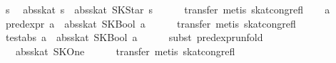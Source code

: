 \begin{isabellebody}
\ s\ \isamarkupfalse%
\ {}abs{}skat\ s\ {}\ abs{}skat\ {}SKStar\ s{}{}\isanewline
\ \ \ \ \isamarkupfalse%
\ {}transfer{}\ metis\ skat{}cong{}refl{}\isanewline
{}\isamarkupfalse%
\isanewline
\ \ \isamarkupfalse%
\ a\isanewline
\ \ \isamarkupfalse%
\ {}pred{}expr\ a\ {}\ abs{}skat\ {}SKBool\ a{}{}\isanewline
\ \ \ \ \isamarkupfalse%
\ {}transfer{}\ metis\ skat{}cong{}refl{}\isanewline
\ \ \isamarkupfalse%
\ {}test{}abs\ a\ {}\ abs{}skat\ {}SKBool\ a{}{}\isanewline
\ \ \ \ \isamarkupfalse%
\ {}subst\ pred{}expr{}unfold{}\isanewline
{}\isamarkupfalse%
\isanewline
\ \ \isamarkupfalse%
\ {}{}\ {}\ abs{}skat\ SKOne{}\isanewline
\ \ \ \ \isamarkupfalse%
\ {}transfer{}\ metis\ skat{}cong{}refl{}\isanewline
{}\isamarkupfalse%
\isanewline
\ \ \isamarkupfalse%

\end{isabellebody}

